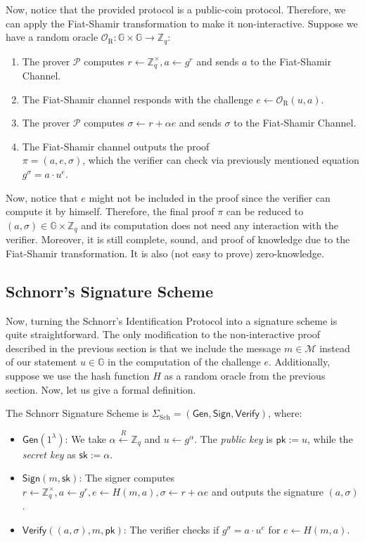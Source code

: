 \documentclass[../lecture-notes.tex]{subfiles}
\begin{document}
Now, notice that the provided protocol is a public-coin protocol. Therefore, we can apply the Fiat-Shamir transformation to make it non-interactive. Suppose we have a random oracle $\mathcal{O}_{\text{R}}: \mathbb{G} \times \mathbb{G} \to \mathbb{Z}_q$:
\begin{enumerate}
    \item The prover $\mathcal{P}$ computes $r \gets \mathbb{Z}_q^{\times}, a \gets g^{r}$ and sends $a$ to the Fiat-Shamir Channel.
    \item The Fiat-Shamir channel responds with the challenge $e \gets \mathcal{O}_{\text{R}}(u,a)$.
    \item The prover $\mathcal{P}$ computes $\sigma \gets r + \alpha e$ and sends $\sigma$ to the Fiat-Shamir Channel.
    \item The Fiat-Shamir channel outputs the proof \\ $\pi = (a,e,\sigma)$, which the verifier can check via previously mentioned equation $g^{\sigma} = a \cdot u^e$.
\end{enumerate}

Now, notice that $e$ might not be included in the proof since the verifier can compute it by himself. Therefore, the final proof $\pi$ can be reduced to $(a,\sigma) \in \mathbb{G} \times \mathbb{Z}_q$ and its computation does not need any interaction with the verifier. Moreover, it is still complete, sound, and proof of knowledge due to the Fiat-Shamir transformation. It is also (not easy to prove) zero-knowledge.

\subsection{Schnorr's Signature Scheme}

Now, turning the Schnorr's Identification Protocol into a signature scheme is quite straightforward. The only modification to the non-interactive proof described in the previous section is that we include the message $m \in \mathcal{M}$ instead of our statement $u \in \mathbb{G}$ in the computation of the challenge $e$. Additionally, suppose we use the hash function $H$ as a random oracle from the previous section. Now, let us give a formal definition.

\begin{definition}
    The Schnorr Signature Scheme is $\Sigma_{\text{Sch}} = (\mathsf{Gen}, \mathsf{Sign}, \mathsf{Verify})$, where:
    \begin{itemize}
        \item $\mathsf{Gen}(1^{\lambda})$: We take $\alpha \xleftarrow{R} \mathbb{Z}_q$ and $u \gets g^{\alpha}$. The \textit{public key} is $\mathsf{pk} := u$, while the \textit{secret key} as $\mathsf{sk} := \alpha$.
        \item $\mathsf{Sign}(m,\mathsf{sk})$: The signer computes $r \gets \mathbb{Z}_q^{\times}, a \gets g^{r}, e \gets H(m, a), \sigma \gets r + \alpha e$ and outputs the signature $(a,\sigma)$.
        \item $\mathsf{Verify}((a, \sigma), m,\mathsf{pk})$: The verifier checks if $g^{\sigma} = a \cdot u^e$ for $e \gets H(m, a)$.
    \end{itemize}
\end{definition}
\end{document}
